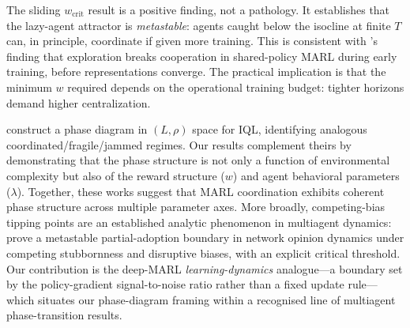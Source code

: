 \documentclass[letterpaper]{article}
\theoremstyle{plain}
\newcommand{\wcrit}{w_{\mathrm{crit}}}
\begin{document}
The sliding $\wcrit$ result is a positive finding, not a pathology.
It establishes that the lazy-agent attractor is \emph{metastable}: agents
caught below the isocline at finite $T$ can, in principle, coordinate if
given more training.
This is consistent with \citet{weng2026}'s finding that exploration breaks
cooperation in shared-policy MARL during early training, before
representations converge.
The practical implication is that the minimum $w$ required depends on the
operational training budget: tighter horizons demand higher centralization.

\citet{yamaguchi2025} construct a phase diagram in $(L, \rho)$ space for
IQL, identifying analogous coordinated/fragile/jammed regimes.
Our results complement theirs by demonstrating that the phase structure is
not only a function of environmental complexity but also of the reward
structure ($w$) and agent behavioral parameters ($\lambda$).
Together, these works suggest that MARL coordination exhibits coherent
phase structure across multiple parameter axes.
More broadly, competing-bias tipping points are an established analytic
phenomenon in multiagent dynamics: \citet{capannoli2026phase} prove a metastable
partial-adoption boundary in network opinion dynamics under competing stubbornness
and disruptive biases, with an explicit critical threshold. Our contribution is
the deep-MARL \emph{learning-dynamics} analogue---a boundary set by the
policy-gradient signal-to-noise ratio rather than a fixed update rule---which
situates our phase-diagram framing within a recognised line of multiagent
phase-transition results.
\end{document}
